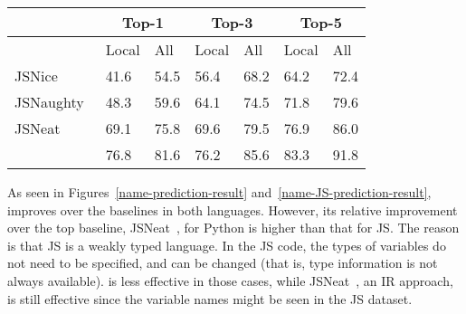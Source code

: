 {{\begin{table}[t]
\begin{center}
\begin{tabular}{|p{1.9cm}<{\centering}|p{0.65cm}<{\centering}|p{0.65cm}<{\centering}|p{0.65cm}<{\centering}|p{0.65cm}<{\centering}|p{0.65cm}<{\centering}|p{0.65cm}<{\centering}|}
			\hline
                       & \multicolumn{2}{c|}{Top-1}         & \multicolumn{2}{c|}{Top-3}         & \multicolumn{2}{c|}{Top-5} \\
			\hline
                       & Local & All & Local & All & Local & All  \\ 
			\hline
		        JSNice~\cite{JSNice2015} &  41.6    & 54.5  & 56.4 &    68.2   & 64.2      &   72.4    \\
			JSNaughty~\cite{JSNaughty2017}  &   48.3   &  59.6    &  64.1    &  74.5    &  71.8    &   79.6    \\
			JSNeat~\cite{icse19}  &   69.1   &  75.8    &  69.6    & 79.5     &  76.9    & 86.0     \\
			\hline
			{\bf {\tool}} & 76.8 & 81.6 & 76.2 & 85.6 & 83.3 & 91.8 \\
			\hline
		\end{tabular}
		\label{name-JS-result}
	\end{center}
\end{table}

As seen in Figures~\ref{name-prediction-result}
and~\ref{name-JS-prediction-result}, {\tool} improves over the
baselines in both languages. However, its relative improvement over
the top baseline, JSNeat~\cite{icse19}, for Python is higher than that
for JS. The reason is that JS is a weakly typed language. In the JS
code, the types of variables do not need to be specified, and can be
changed (that is, type information is not always available). {\tool}
is less effective in those cases, while JSNeat~\cite{icse19}, an IR
approach, is still effective since the variable names might be seen in
the JS dataset.



}}
